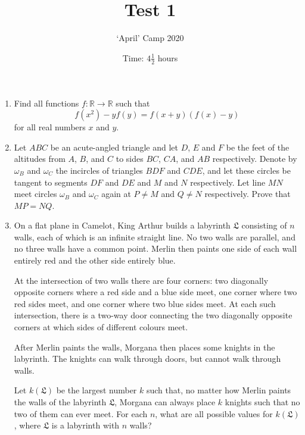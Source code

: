 \documentclass[11pt]{article}
\title{Test 1}
\author{`April' Camp 2020}
\date{Time: $4\frac{1}{2}$ hours}
\begin{document}
\maketitle
\thispagestyle{empty}


\begin{enumerate}[1.]

\vfill
\item %
Find all functions $f : \mathbb{R} \to \mathbb{R}$ such that
\[ f(x^2) -yf(y) = f(x+y)(f(x)-y) \]
for all real numbers $x$ and $y$.


\vfill
\item %
Let $ABC$ be an acute-angled triangle and let $D$, $E$ and $F$ be the feet of the altitudes from $A$, $B$, and $C$ to sides $BC$, $CA$, and $AB$ respectively.
Denote by $\omega_B$ and $\omega_C$ the incircles of triangles $BDF$ and $CDE$, and let these circles be tangent to segments $DF$ and $DE$ and $M$ and $N$ respectively.
Let line $MN$ meet circles $\omega_B$ and $\omega_C$ again at $P \neq M$ and $Q \neq N$ respectively.
Prove that $MP = NQ$.


\vfill
\item %
\newcommand{\LL}{\mathfrak{L}}
On a flat plane in Camelot, King Arthur builds a labyrinth $\LL$ consisting of $n$ walls, each of which is an infinite straight line.
No two walls are parallel, and no three walls have a common point.
Merlin then paints one side of each wall entirely red and the other side entirely blue.

At the intersection of two walls there are four corners: two diagonally opposite corners where a red side and a blue side meet, one corner where two red sides meet, and one corner where two blue sides meet.
At each such intersection, there is a two-way door connecting the two diagonally opposite corners at which sides of different colours meet.

After Merlin paints the walls, Morgana then places some knights in the labyrinth.
The knights can walk through doors, but cannot walk through walls.

Let $k(\LL)$ be the largest number $k$ such that, no matter how Merlin paints the walls of the labyrinth $\LL$, Morgana can always place $k$ knights such that no two of them can ever meet.
For each $n$, what are all possible values for $k(\LL)$, where $\LL$ is a labyrinth with $n$ walls?

\vfill
\end{enumerate}


\vfill
\centering
\begin{BVerbatim}
\end{BVerbatim}
\end{document}
